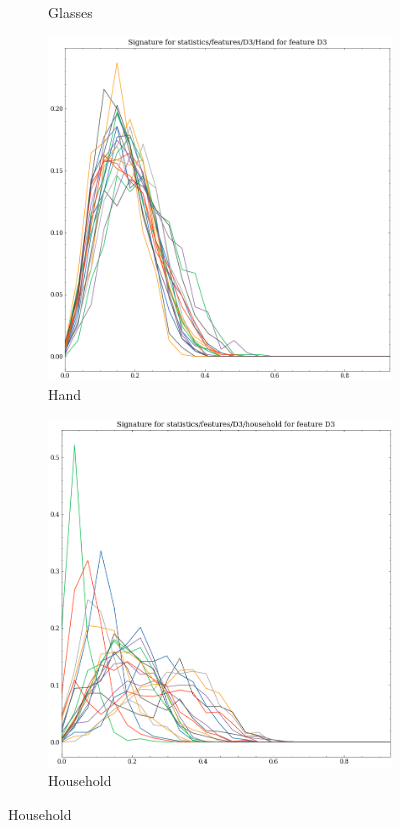 \begin{figure}[t!p]
\begin{subfigure}[b]{0.23\textwidth}
        \caption{Glasses}
    \end{subfigure}
    \hfill
    \begin{subfigure}[b]{0.23\textwidth}
        \includegraphics[width=\textwidth]{assets/feature_extraction/D3/Hand.png}
        \caption{Hand}
    \end{subfigure}
    \hfill
    \begin{subfigure}[b]{0.23\textwidth}
        \includegraphics[width=\textwidth]{assets/feature_extraction/D3/household.png}
        \caption{Household}
    \end{subfigure}
    \hfill


\end{figure}

